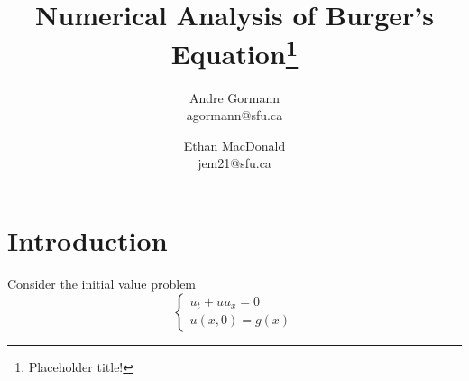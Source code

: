 \documentclass{myproject}
\title{Numerical Analysis of Burger's Equation\footnote{Placeholder title!}}
\date{}
\author{
    Andre Gormann\\
    agormann@sfu.ca
    \and
    Ethan MacDonald\\
    jem21@sfu.ca
}
\begin{document}
\maketitle

\section{Introduction}
Consider the initial value problem
\[
    \begin{cases}
        u_t + uu_x = 0 \\
        u(x, 0) = g(x)
    \end{cases}
\]

\nocite{choksi2022}
\nocite{kutz2013}
\printbibliography
\end{document}
